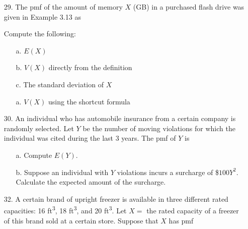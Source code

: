 \documentclass[letterpaper,12pt]{article}
\begin{document}
\maketitle

\begin{enumerate}
  \item[29.]
    The pmf of the amount of memory $X$ (GB) in a purchased flash drive was given in Example 3.13 as
    \begin{center}
    \end{center}
    Compute the following:
    \begin{enumerate}
      \item[a.]
        $E(X)$
      \item[b.]
        $V(X)$ directly from the definition
      \item[c.]
        The standard deviation of $X$
      \item[a.]
        $V(X)$ using the shortcut formula
    \end{enumerate}
  \item[30.]
    An individual who has automobile insurance from a certain company is randomly selected. Let $Y$ be the number of moving violations for which the individual was cited during the last 3 years. The pmf of $Y$ is
    \begin{center}
    \end{center}
    \begin{enumerate}
      \item[a.]
        Compute $E(Y)$.
      \item[b.]
        Suppose an individual with $Y$ violations incurs a surcharge of \$$100Y^2$. Calculate the expected amount of the surcharge.
    \end{enumerate}
  \item[32.]
    A certain brand of upright freezer is available in three different rated capacities: 16 ft\textsuperscript{3}, 18 ft\textsuperscript{3}, and 20 ft\textsuperscript{3}. Let $X =$ the rated capacity of a freezer of this brand sold at a certain store. Suppose that $X$ has pmf

\end{enumerate}
\end{document}
